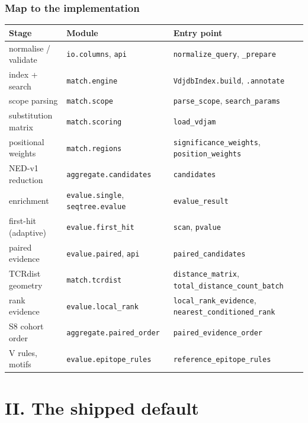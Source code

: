 \documentclass[10pt,a4paper]{article}
\theoremstyle{definition}
\newcommand{\code}[1]{\texttt{\small #1}}
\begin{document}
\section{Map to the implementation}
\begin{center}\small
\begin{tabular}{@{}lll@{}}
\toprule
Stage & Module & Entry point\\
\midrule
normalise / validate & \code{io.columns}, \code{api} & \code{normalize\_query}, \code{\_prepare}\\
index + search & \code{match.engine} & \code{VdjdbIndex.build}, \code{.annotate}\\
scope parsing & \code{match.scope} & \code{parse\_scope}, \code{search\_params}\\
substitution matrix & \code{match.scoring} & \code{load\_vdjam}\\
positional weights & \code{match.regions} & \code{significance\_weights}, \code{position\_weights}\\
NED-v1 reduction & \code{aggregate.candidates} & \code{candidates}\\
enrichment & \code{evalue.single}, \code{seqtree.evalue} & \code{evalue\_result}\\
first-hit (adaptive) & \code{evalue.first\_hit} & \code{scan}, \code{pvalue}\\
paired evidence & \code{evalue.paired}, \code{api} & \code{paired\_candidates}\\
TCRdist geometry & \code{match.tcrdist} & \code{distance\_matrix}, \code{total\_distance\_count\_batch}\\
rank evidence & \code{evalue.local\_rank} & \code{local\_rank\_evidence}, \code{nearest\_conditioned\_rank}\\
S8 cohort order & \code{aggregate.paired\_order} & \code{paired\_evidence\_order}\\
V rules, motifs & \code{evalue.epitope\_rules} & \code{reference\_epitope\_rules}\\
\bottomrule
\end{tabular}
\end{center}

\part*{II. The shipped default}
\end{document}

